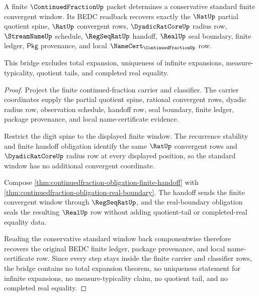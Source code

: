 \begin{theorem}
\label{thm:continued-fraction-convergent-window-standard-bridge}
A finite $\ContinuedFractionUp$ packet determines a conservative standard
finite convergent window. Its BEDC readback recovers exactly the $\NatUp$
partial quotient spine, $\RatUp$ convergent rows, $\DyadicRatCoreUp$ radius
row, $\StreamNameUp$ schedule, $\RegSeqRatUp$ handoff, $\RealUp$ seal boundary,
finite ledger, $\mathsf{Pkg}$ provenance, and local
$\NameCert_{\ContinuedFractionUp}$ row.

This bridge excludes total expansion, uniqueness of infinite expansions,
measure-typicality, quotient tails, and completed real equality.
\end{theorem}
\begin{proof}
Project the finite continued-fraction carrier and classifier. The carrier
coordinates supply the partial quotient spine, rational convergent rows, dyadic
radius row, observation schedule, handoff row, seal boundary, finite ledger,
package provenance, and local name-certificate evidence.

Restrict the digit spine to the displayed finite window. The recurrence
stability and finite handoff obligation identify the same $\RatUp$ convergent
rows and $\DyadicRatCoreUp$ radius row at every displayed position, so the
standard window has no additional convergent coordinate.

Compose \autoref{thm:continuedfraction-obligation-finite-handoff} with
\autoref{thm:continuedfraction-obligation-real-boundary}. The handoff sends the
finite convergent window through $\RegSeqRatUp$, and the real-boundary
obligation seals the resulting $\RealUp$ row without adding quotient-tail or
completed-real equality data.

Reading the conservative standard window back componentwise therefore recovers
the original BEDC finite ledger, package provenance, and local name-certificate
row. Since every step stays inside the finite carrier and classifier rows, the
bridge contains no total expansion theorem, no uniqueness statement for
infinite expansions, no measure-typicality claim, no quotient tail, and no
completed real equality.
\end{proof}

